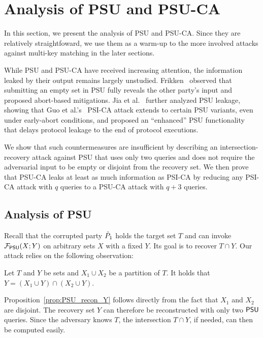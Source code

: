 \section{Analysis of PSU and PSU-CA}
\label{sec:psu-psuca}
In this section, we present the analysis
of PSU and PSU-CA. Since they are relatively straightfoward, we use them as a warm-up to the more involved attacks against multi-key matching in the later sections.

While PSU and PSU-CA have received increasing attention, the information leaked by their output remains largely unstudied. Frikken~\cite{ACNS:Frikken07}
observed that submitting an empty set in PSU fully reveals the other party's
input and proposed abort-based mitigations. Jia et al.~\cite{USENIX:JSZG24}
further analyzed PSU leakage, showing that Guo et al.'s~\cite{USENIX:GHLWJL22} PSI-CA attack extends to certain PSU variants, even under early-abort conditions, and proposed an ``enhanced'' PSU functionality that delays protocol leakage to the end of protocol executions.

We show that such countermeasures are insufficient by describing an
intersection-recovery attack against PSU that uses only two queries and does not require the adversarial input to be empty or disjoint from the recovery set. We then prove that PSU-CA leaks at least as much information as PSI-CA by reducing
any PSI-CA attack with $q$ queries to a PSU-CA attack with $q{+}3$ queries.


\subsection{Analysis of PSU}
\label{sec:psu-attack}
Recall that the corrupted party $\tilde{P}_1$ holds the target set $T$ and can invoke
$\mathcal{F}_{\mathsf{PSU}}(X; Y)$ on arbitrary sets $X$ with a fixed $Y$. Its goal is to
recover $T \cap Y$. Our attack relies on the following observation:

\begin{proposition}\label{prop:PSU_recon_Y}
  Let $T$ and $Y$ be sets and $X_1 \cup X_2$ be a partition of $T$. It holds
  that $Y = (X_1 \cup Y) \cap (X_2 \cup Y)$.
\end{proposition}

Proposition~\ref{prop:PSU_recon_Y} follows directly from the fact that $X_1$ and $X_2$ are disjoint. 
The recovery set $Y$ can therefore be reconstructed with only two $\mathsf{PSU}$ queries.
Since the adversary knows $T$, the intersection $T \cap Y$, if needed, can then be computed easily.


